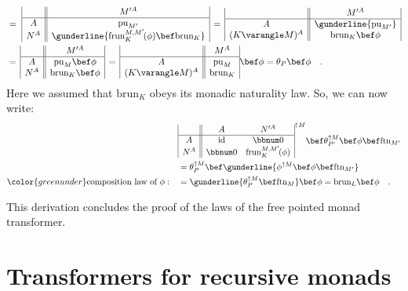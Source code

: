 \begin{align*}
 & =\,\,\begin{array}{|c||c|}
 & M^{\prime A}\\
\hline A & \text{pu}_{M^{\prime}}\\
N^{A} & \gunderline{\text{frun}_{K}^{M,M^{\prime}}\!(\phi)\bef\text{brun}_{K}}
\end{array}\,=\,\begin{array}{|c||c|}
 & M^{\prime A}\\
\hline A & \gunderline{\text{pu}_{M^{\prime}}}\\
(K\varangle M)^{A} & \text{brun}_{K}\bef\phi
\end{array}\\
 & =\,\begin{array}{|c||c|}
 & M^{\prime A}\\
\hline A & \text{pu}_{M}\bef\phi\\
N^{A} & \text{brun}_{K}\bef\phi
\end{array}\,=\,\begin{array}{|c||c|}
 & M^{A}\\
\hline A & \text{pu}_{M}\\
(K\varangle M)^{A} & \text{brun}_{K}
\end{array}\bef\phi=\theta_{P}\bef\phi\quad.
\end{align*}
Here we assumed that $\text{brun}_{K}$ obeys its monadic naturality
law. So, we can now write:
\begin{align*}
 & \begin{array}{|c||cc|}
 & A & N^{\prime A}\\
\hline A & \text{id} & \bbnum 0\\
N^{A} & \bbnum 0 & \text{frun}_{K}^{M,M^{\prime}}\!(\phi)
\end{array}^{\uparrow M}\bef\theta_{P^{\prime}}^{\uparrow M}\bef\phi\bef\text{ftn}_{M^{\prime}}\\
 & =\theta_{P}^{\uparrow M}\bef\gunderline{\phi^{\uparrow M}\bef\phi\bef\text{ftn}_{M^{\prime}}}\\
{\color{greenunder}\text{composition law of }\phi:}\quad & =\gunderline{\theta_{P}^{\uparrow M}\bef\text{ftn}_{M}}\bef\phi=\text{brun}_{L}\bef\phi\quad.
\end{align*}

This derivation concludes the proof of the laws of the free pointed
monad transformer.

\section{Transformers for recursive monads}

